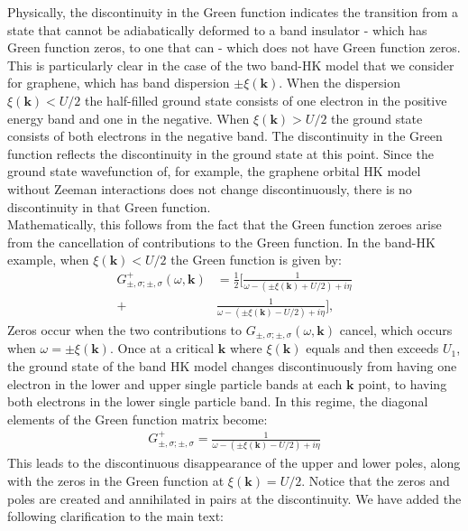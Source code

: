 \documentclass[aps,reprint,notitlepage,onecolumn,12pt]{revtex4-2}
\numberwithin{equation}{section}
\begin{document}
Physically, the discontinuity in the Green function indicates the transition from a state that cannot be adiabatically deformed to a band insulator - which has Green function zeros, to one that can - which does not have Green function zeros. This is particularly clear in the case of the two band-HK model that we consider for graphene, which has band dispersion $\pm\xi(\mathbf{k})$. When the dispersion $\xi(\mathbf{k})<U/2$ the half-filled ground state consists of one electron in the positive energy band and one in the negative. When $\xi(\mathbf{k})>U/2$ the ground state consists of both electrons in the negative band. The discontinuity in the Green function reflects the discontinuity in the ground state at this point.  Since the ground state wavefunction of, for example, the graphene orbital HK model without Zeeman interactions does not change discontinuously, there is no discontinuity in that Green function.  \\

Mathematically, this follows from the fact that the Green function zeroes arise from the cancellation of contributions to the Green function. In the band-HK example, when $\xi(\mathbf{k})<U/2$ the Green function is given by:
\begin{align}
    G^{+}_{\pm,\sigma;\pm,\sigma}(\omega,\mathbf{k})&=\frac{1}{2}\bigg[\frac{1}{\omega-(\pm\xi(\mathbf{k})+U/2)+i\eta}\\ \nonumber+&\frac{1}{\omega-(\pm\xi(\mathbf{k})-U/2)+i\eta}\bigg],
\end{align}
Zeros occur when the two contributions to $G_{\pm,\sigma;\pm,\sigma}(\omega,\mathbf{k})$ cancel, which occurs when $\omega=\pm\xi(\mathbf{k})$.
Once at a critical $\mathbf{k}$ where $\xi(\mathbf{k})$ equals and then exceeds $U_1$, the ground state of the band HK model changes discontinuously from having one electron in the lower and upper single particle bands at each $\mathbf{k}$ point, to having both electrons in the lower single particle band. In this regime, the diagonal elements of the Green function matrix become:
\begin{align}
    G^{+}_{\pm,\sigma;\pm,\sigma}=\frac{1}{\omega -(\pm\xi(\mathbf{k})-U/2)+i\eta}
\end{align}
This leads to the discontinuous disappearance of the upper and lower poles, along with the zeros in the Green function at $\xi(\mathbf{k})=U/2$. Notice that the zeros and poles are created and annihilated in pairs at the discontinuity.
We have added the following clarification to the main text:\\
\end{document}
